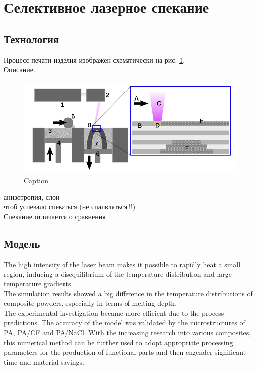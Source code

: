 

\section{Селективное лазерное спекание}
\subsection{Технология}
Процесс печати изделия изображен схематически на рис. \ref{fig:printer}.\\
Описание. 


\begin{figure}[h]
    \centering
    \includegraphics[width=\linewidth]{fig/sls.png}
    \caption{Caption}
    \label{fig:printer}
\end{figure}
анизотропия, слои\\
чтоб успевало спекаться (не спалвляться!!!)\\
Спекание отличается о сравнения

\subsection{Модель}

The high intensity of
the laser beam makes it possible to rapidly heat a small
region, inducing a disequilibrium of the temperature
distribution and large temperature gradients.\cite{sls-sim2016}
\\
The simulation
results showed a big difference in the temperature distributions
of composite powders, especially in terms of melting depth.\\
The experimental investigation became more
efficient due to the process predictions. The accuracy of the model
was validated by the microstructures of PA, PA/CF and PA/NaCl.
With the increasing research into various composites, this numerical
method can be further used to adopt appropriate processing
parameters for the production of functional parts and then engender
significant time and material savings.

